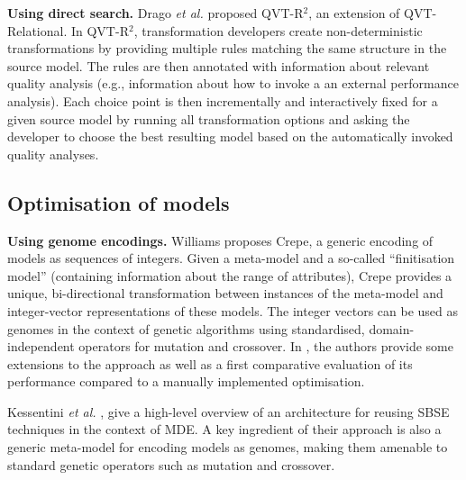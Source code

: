 		\textbf{Using direct search.}
			Drago \emph{et al.} \cite{Drago+10,Drago+11,Drago+15} proposed QVT-R$^2$, an extension of QVT-Relational. In QVT-R$^2$, transformation developers create 
			non-deterministic transformations by providing multiple rules matching the same structure in the source model. The rules are then annotated with information
			about relevant quality analysis (e.g., information about how to invoke a an external performance analysis). Each choice point is then incrementally and
			interactively fixed for a given source model by running all transformation options and asking the developer to choose the best resulting model based on the
			automatically invoked quality analyses.

	\subsection{Optimisation of models}
	
	  \textbf{Using genome encodings.}
			Williams \cite{Williams13} proposes Crepe, a generic encoding of models as sequences of integers. Given a meta-model and a so-called ``finitisation model'' 
			(containing information about the range of attributes), Crepe provides a unique, bi-directional transformation between instances of the meta-model and
			integer-vector representations of these models. The integer vectors can be used as genomes in the context of genetic algorithms using standardised, 
			domain-independent operators for mutation and crossover. In \cite{Efstathiou+14b}, the authors provide some extensions to the approach as well as a first
			comparative evaluation of its performance compared to a manually implemented optimisation.
			
			Kessentini \emph{et al.} \cite{Kessentini+13}, give a high-level overview of an architecture for reusing SBSE techniques in the context of MDE. A key
			ingredient of their approach is also a generic meta-model for encoding models as genomes, making them amenable to standard genetic operators such as
			mutation and crossover.

